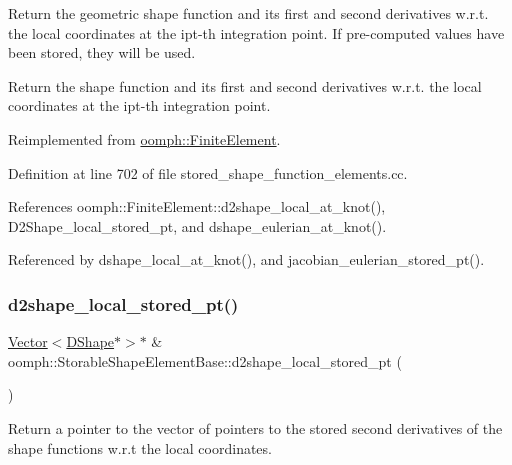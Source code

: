 Return the geometric shape function and its first and second derivatives w.\+r.\+t. the local coordinates at the ipt-\/th integration point. If pre-\/computed values have been stored, they will be used. 

Return the shape function and its first and second derivatives w.\+r.\+t. the local coordinates at the ipt-\/th integration point. 

Reimplemented from \hyperlink{classoomph_1_1FiniteElement_a5330790998d0b103d87da72b57fc633a}{oomph\+::\+Finite\+Element}.



Definition at line 702 of file stored\+\_\+shape\+\_\+function\+\_\+elements.\+cc.



References oomph\+::\+Finite\+Element\+::d2shape\+\_\+local\+\_\+at\+\_\+knot(), D2\+Shape\+\_\+local\+\_\+stored\+\_\+pt, and dshape\+\_\+eulerian\+\_\+at\+\_\+knot().



Referenced by dshape\+\_\+local\+\_\+at\+\_\+knot(), and jacobian\+\_\+eulerian\+\_\+stored\+\_\+pt().

\mbox{\label{classoomph_1_1StorableShapeElementBase_a49fd0060048f85f20f5d05a89323fb07}} 
\subsubsection{\texorpdfstring{d2shape\+\_\+local\+\_\+stored\+\_\+pt()}{d2shape\_local\_stored\_pt()}\hspace{0.1cm}{\footnotesize\ttfamily [1/2]}}
{\footnotesize\ttfamily \hyperlink{classoomph_1_1Vector}{Vector}$<$\hyperlink{classoomph_1_1DShape}{D\+Shape}$\ast$$>$$\ast$ \& oomph\+::\+Storable\+Shape\+Element\+Base\+::d2shape\+\_\+local\+\_\+stored\+\_\+pt (\begin{DoxyParamCaption}{ }\end{DoxyParamCaption})\hspace{0.3cm}{\ttfamily [inline]}}



Return a pointer to the vector of pointers to the stored second derivatives of the shape functions w.\+r.\+t the local coordinates. 



